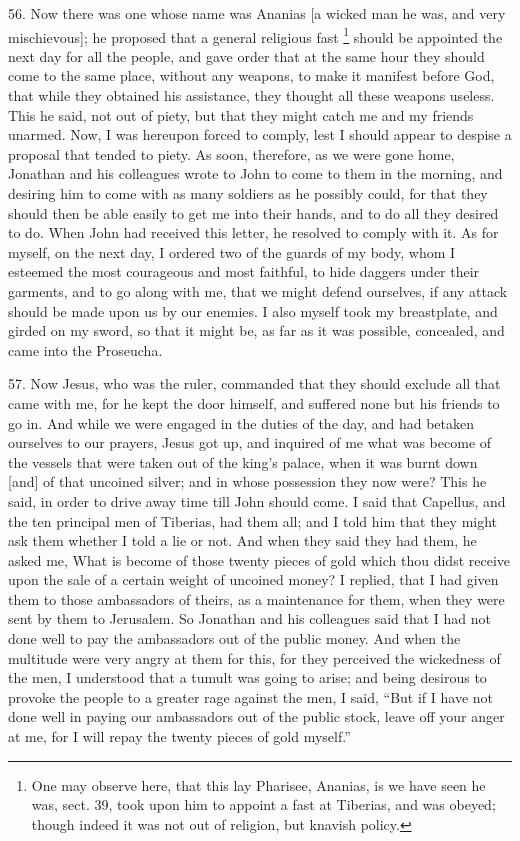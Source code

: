 56. Now there was one whose name was Ananias [a wicked man he was, and
very mischievous]; he proposed that a general religious fast \footnote{One may observe here,
that this lay Pharisee, Ananias, is we have seen he was, sect. 39, took
upon him to appoint a fast at Tiberias, and was obeyed; though indeed it
was not out of religion, but knavish policy.}
should be appointed the next day for all the people, and gave order that
at the same hour they should come to the same place, without any weapons,
to make it manifest before God, that while they obtained his assistance,
they thought all these weapons useless. This he said, not out of piety,
but that they might catch me and my friends unarmed. Now, I was hereupon
forced to comply, lest I should appear to despise a proposal that tended
to piety. As soon, therefore, as we were gone home, Jonathan and his
colleagues wrote to John to come to them in the morning, and desiring him
to come with as many soldiers as he possibly could, for that they should
then be able easily to get me into their hands, and to do all they desired
to do. When John had received this letter, he resolved to comply with it.
As for myself, on the next day, I ordered two of the guards of my body,
whom I esteemed the most courageous and most faithful, to hide daggers
under their garments, and to go along with me, that we might defend
ourselves, if any attack should be made upon us by our enemies. I also
myself took my breastplate, and girded on my sword, so that it might be,
as far as it was possible, concealed, and came into the Proseucha.

57. Now Jesus, who was the ruler, commanded that they should exclude all
that came with me, for he kept the door himself, and suffered none but his
friends to go in. And while we were engaged in the duties of the day, and
had betaken ourselves to our prayers, Jesus got up, and inquired of me
what was become of the vessels that were taken out of the king's palace,
when it was burnt down [and] of that uncoined silver; and in whose
possession they now were? This he said, in order to drive away time till
John should come. I said that Capellus, and the ten principal men of
Tiberias, had them all; and I told him that they might ask them whether I
told a lie or not. And when they said they had them, he asked me, What is
become of those twenty pieces of gold which thou didst receive upon the
sale of a certain weight of uncoined money? I replied, that I had given
them to those ambassadors of theirs, as a maintenance for them, when they
were sent by them to Jerusalem. So Jonathan and his colleagues said that I
had not done well to pay the ambassadors out of the public money. And when
the multitude were very angry at them for this, for they perceived the
wickedness of the men, I understood that a tumult was going to arise; and
being desirous to provoke the people to a greater rage against the men, I
said, ``But if I have not done well in paying our ambassadors out of the
public stock, leave off your anger at me, for I will repay the twenty
pieces of gold myself.''

